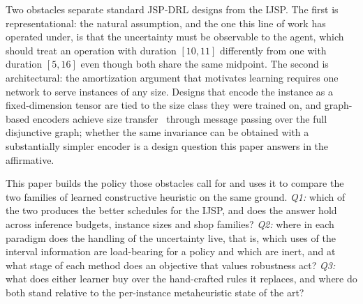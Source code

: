 \documentclass[preprint,12pt]{elsarticle}
\theoremstyle{definition}
\theoremstyle{remark}
\begin{document}
Two obstacles separate standard JSP-DRL designs from the IJSP.
The first is representational: the natural assumption, and the one
this line of work has operated under, is that the uncertainty must be
observable to the agent, which should treat an operation with
duration $[10,11]$ differently from one with duration $[5,16]$ even
though both share the same midpoint. The second is
architectural: the amortization argument that motivates learning
requires one network to serve instances of any size. Designs that
encode the instance as a fixed-dimension tensor are tied to the size
class they were trained on, and graph-based encoders achieve size
transfer~\citep{Zhang2020L2D,Park2021GNN} through message passing
over the full disjunctive graph; whether the same invariance can be
obtained with a substantially simpler encoder is a design question
this paper answers in the affirmative.

This paper builds the policy those obstacles call for and uses it to
compare the two families of learned constructive heuristic on the same
ground. \emph{Q1:} which of the two produces the better schedules for
the IJSP, and does the answer hold across inference budgets, instance
sizes and shop families? \emph{Q2:} where in each paradigm does the
handling of the uncertainty live, that is, which uses of the interval
information are load-bearing for a policy and which are inert, and at
what stage of each method does an objective that values robustness
act? \emph{Q3:} what does either learner buy over the hand-crafted
rules it replaces, and where do both stand relative to the
per-instance metaheuristic state of the art?
\end{document}

